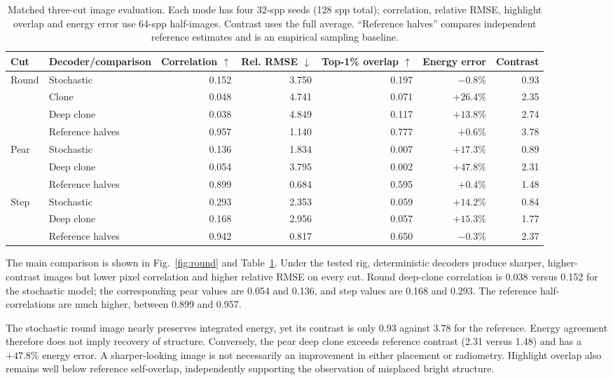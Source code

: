 \documentclass[conference]{IEEEtran}
\begin{document}
\begin{table}[t]
\caption{Matched three-cut image evaluation. Each mode has four 32-spp seeds
(128 spp total); correlation, relative RMSE, highlight overlap and energy error
use 64-spp half-images. Contrast uses the full average. ``Reference halves''
compares independent reference estimates and is an empirical sampling baseline.}
\label{tab:images}
\centering\small
\begin{tabular}{@{}llrrrrr@{}}
\toprule
Cut & Decoder/comparison & Correlation $\uparrow$ & Rel. RMSE $\downarrow$ & Top-1\% overlap $\uparrow$ & Energy error & Contrast \\
\midrule
Round & Stochastic & 0.152 & 3.750 & 0.197 & $-0.8\%$ & 0.93 \\
 & Clone & 0.048 & 4.741 & 0.071 & $+26.4\%$ & 2.35 \\
 & Deep clone & 0.038 & 4.849 & 0.117 & $+13.8\%$ & 2.74 \\
 & Reference halves & 0.957 & 1.140 & 0.777 & $+0.6\%$ & 3.78 \\
\midrule
Pear & Stochastic & 0.136 & 1.834 & 0.007 & $+17.3\%$ & 0.89 \\
 & Deep clone & 0.054 & 3.795 & 0.002 & $+47.8\%$ & 2.31 \\
 & Reference halves & 0.899 & 0.684 & 0.595 & $+0.4\%$ & 1.48 \\
\midrule
Step & Stochastic & 0.293 & 2.353 & 0.059 & $+14.2\%$ & 0.84 \\
 & Deep clone & 0.168 & 2.956 & 0.057 & $+15.3\%$ & 1.77 \\
 & Reference halves & 0.942 & 0.817 & 0.650 & $-0.3\%$ & 2.37 \\
\bottomrule
\end{tabular}
\end{table}

The main comparison is shown in Fig.~\ref{fig:round} and
Table~\ref{tab:images}. Under the tested rig, deterministic decoders produce
sharper, higher-contrast images but lower pixel correlation and higher relative
RMSE on every cut. Round deep-clone correlation is 0.038 versus 0.152 for the
stochastic model; the corresponding pear values are 0.054 and 0.136, and step
values are 0.168 and 0.293. The reference half-correlations are much higher,
between 0.899 and 0.957.

The stochastic round image nearly preserves integrated energy, yet its contrast
is only 0.93 against 3.78 for the reference. Energy agreement therefore does not
imply recovery of structure. Conversely, the pear deep clone exceeds reference
contrast (2.31 versus 1.48) and has a $+47.8\%$ energy error. A sharper-looking
image is not necessarily an improvement in either placement or radiometry.
Highlight overlap also remains well below reference self-overlap, independently
supporting the observation of misplaced bright structure.
\end{document}
